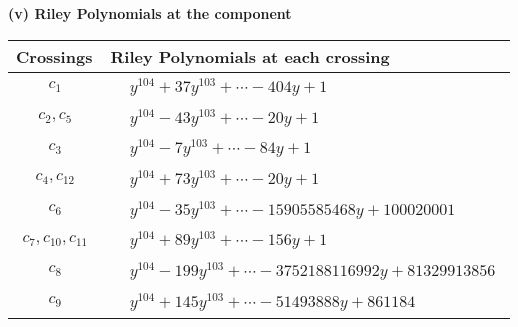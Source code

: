 \documentclass[1p]{elsarticle_modified}
\theoremstyle{definition}
\begin{document}
\newpage\renewcommand{\arraystretch}{1}
\flushleft \textbf{(v) Riley Polynomials at the component}\newline \\
\begin{tabular}{m{50pt}|m{274pt}}
Crossings & \hspace{64pt}Riley Polynomials at each crossing \\
\hline $$\begin{aligned}c_{1}\end{aligned}$$&$\begin{aligned}
&y^{104}+37 y^{103}+\cdots-404 y+1
\end{aligned}$\\
\hline $$\begin{aligned}c_{2},c_{5}\end{aligned}$$&$\begin{aligned}
&y^{104}-43 y^{103}+\cdots-20 y+1
\end{aligned}$\\
\hline $$\begin{aligned}c_{3}\end{aligned}$$&$\begin{aligned}
&y^{104}-7 y^{103}+\cdots-84 y+1
\end{aligned}$\\
\hline $$\begin{aligned}c_{4},c_{12}\end{aligned}$$&$\begin{aligned}
&y^{104}+73 y^{103}+\cdots-20 y+1
\end{aligned}$\\
\hline $$\begin{aligned}c_{6}\end{aligned}$$&$\begin{aligned}
&y^{104}-35 y^{103}+\cdots-15905585468 y+100020001
\end{aligned}$\\
\hline $$\begin{aligned}c_{7},c_{10},c_{11}\end{aligned}$$&$\begin{aligned}
&y^{104}+89 y^{103}+\cdots-156 y+1
\end{aligned}$\\
\hline $$\begin{aligned}c_{8}\end{aligned}$$&$\begin{aligned}
&y^{104}-199 y^{103}+\cdots-3752188116992 y+81329913856
\end{aligned}$\\
\hline $$\begin{aligned}c_{9}\end{aligned}$$&$\begin{aligned}
&y^{104}+145 y^{103}+\cdots-51493888 y+861184
\end{aligned}$\\
\hline
\end{tabular}\\~\\
\end{document}
